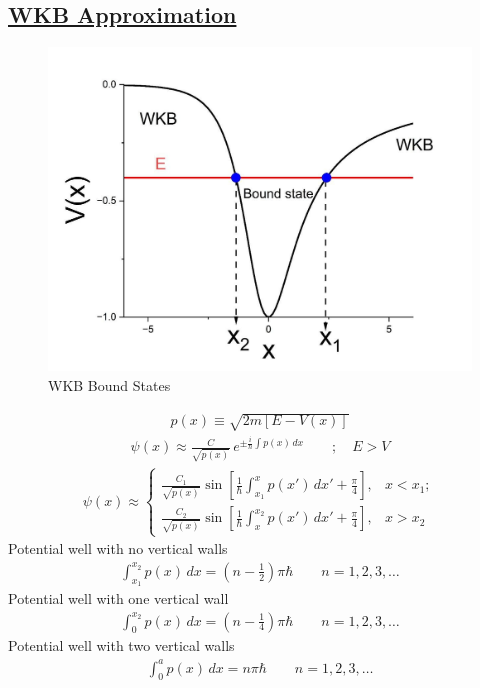 \newpage
\subsection*{\underline{WKB Approximation}}
\begin{figure}[h]
	\centering
	\includegraphics[width=0.5\linewidth]{./figures/wkb-bound-states.png}
	\caption{WKB Bound States}
	\label{fig:wkb-bound-states}
\end{figure}
\begin{align}
	p(x) \equiv \sqrt{2m[E-V(x)]}
\end{align}
\begin{align}
	\psi(x) \approx \frac{C}{\sqrt{p(x)}} \, e^{\pm \frac{i}{\hbar} \int p(x)\, dx}
	\qquad; \quad E > V
\end{align}
\begin{align}
	\psi(x) \approx \begin{cases}
		\frac{C_1}{\sqrt{p(x)}} \sin{\left[ \frac{1}{\hbar} \int_{x_1}^{x} p(x')\, dx' + \frac{\pi}{4}\right]}, & x<x_1 ; \\
		\frac{C_2}{\sqrt{p(x)}} \sin{\left[ \frac{1}{\hbar} \int_{x}^{x_2} p(x')\, dx' + \frac{\pi}{4}\right]}, & x>x_2 
	\end{cases}
\end{align}
Potential well with no vertical walls
\begin{align}
	\int_{x_1}^{x_2} p(x) \, dx = \left( n - \frac{1}{2} \right) \pi \hbar \qquad n=1, 2, 3, \dots
\end{align}
Potential well with one vertical wall
\begin{align}
	\int_0^{x_2} p(x)\, dx = \left(n - \frac{1}{4} \right) \pi \hbar \qquad n=1, 2, 3, \dots
\end{align}
Potential well with two vertical walls
\begin{align}
	\int_0^a p(x) \, dx = n\pi \hbar \qquad n=1, 2, 3, \dots
\end{align}




